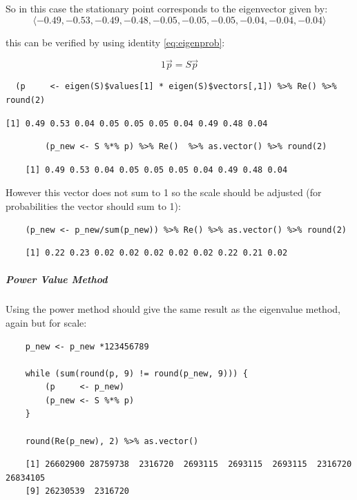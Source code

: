\documentclass[11pt]{article}
\begin{document}
So in this case the stationary point corresponds to the eigenvector given by:
\[
\langle -0.49, -0.53, -0.49, -0.48, -0.05, -0.05, -0.05, -0.04, -0.04, -0.04 \rangle
\]

this can be verified by using identity \eqref{eq:eigenprob}:

$$
1 \vec{p} = S\vec{p}
$$

\begin{verbatim}
  (p     <- eigen(S)$values[1] * eigen(S)$vectors[,1]) %>% Re() %>%  round(2)
\end{verbatim}

\begin{verbatim}
[1] 0.49 0.53 0.04 0.05 0.05 0.05 0.04 0.49 0.48 0.04
\end{verbatim}


\begin{tcolorbox}
    \begin{verbatim}
        (p_new <- S %*% p) %>% Re()  %>% as.vector() %>% round(2)
    \end{verbatim}
 \tcblower
    \begin{verbatim}
    [1] 0.49 0.53 0.04 0.05 0.05 0.05 0.04 0.49 0.48 0.04
    \end{verbatim}
\end{tcolorbox}


However this vector does not sum to 1 so the scale should be adjusted
(for probabilities the vector should sum to 1):

\begin{tcolorbox}
    \begin{verbatim}
    (p_new <- p_new/sum(p_new)) %>% Re() %>% as.vector() %>% round(2)
    \end{verbatim}
\tcblower
    \begin{verbatim}
    [1] 0.22 0.23 0.02 0.02 0.02 0.02 0.02 0.22 0.21 0.02
    \end{verbatim}
\end{tcolorbox}

\subparagraph{Power Value Method}
\label{power-value-method}
Using the power method should give the same result as the eigenvalue method, again but for scale:

\begin{tcolorbox}
    \begin{verbatim}
    p_new <- p_new *123456789

    while (sum(round(p, 9) != round(p_new, 9))) {
        (p     <- p_new)
        (p_new <- S %*% p)
    }

    round(Re(p_new), 2) %>% as.vector()
    \end{verbatim}
\tcblower
    \begin{verbatim}
    [1] 26602900 28759738  2316720  2693115  2693115  2693115  2316720 26834105
    [9] 26230539  2316720
    \end{verbatim}
\end{tcolorbox}
\end{document}
